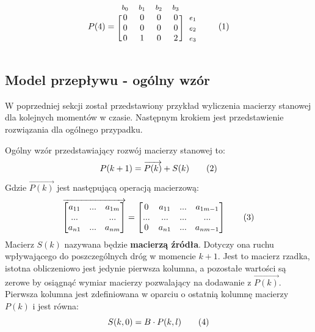 \documentclass[12pt]{book}
\newcommand\addtag{\refstepcounter{equation}
\tag{\theequation}}
\begin{document}
\begin{equation*}
  P(4)=
  \begin{blockarray}{*{4}{c} l}
    \begin{block}{*{4}{>{$\footnotesize}c<{$}} l}
     $b_0$ & $b_1$ & $b_2$ & $b_3$ \\
    \end{block}
    \begin{block}{[*{4}{c}]>{$\footnotesize}l<{$}}
       0 & 0 & 0 & 0 & $e_1$ \\
       0 & 0 & 0 & 0 & $e_2$ \\
       0 & 1 & 0 & 2 & $e_3$ \\
    \end{block}
  \end{blockarray} \addtag
\end{equation*}

\subsection{Model przepływu - ogólny wzór}
W poprzedniej sekcji został przedstawiony przykład wyliczenia macierzy stanowej dla kolejnych momentów w czasie. Następnym krokiem jest przedstawienie rozwiązania dla ogólnego przypadku. \\ 

\begin{tcolorbox}

Ogólny wzór przedstawiający rozwój macierzy stanowej to:
\[P(k+1)=\overrightarrow{P(k)} + S(k) \addtag \label{eq:P}\]
Gdzie $\overrightarrow{P(k)}$ jest następującą operacją macierzową:
\begin{gather}
\overrightarrow{
  \begin{bmatrix}
   a_{11} & ... & a_{1m}\\
   ... & & ...\\
   a_{n1} & ... & a_{nm}\\
   \end{bmatrix}}
 =
  \begin{bmatrix}
   0 & a_{11} & ... & a_{1m-1}\\
   ... & ... & ... & ...\\
   0 & a_{n1} & ... & a_{nm-1}\\
   \end{bmatrix}
   \addtag
   \label{arrow_function}
\end{gather}
Macierz $S(k)$ nazywana będzie \textbf{macierzą źródła}. Dotyczy ona ruchu wpływającego do poszczególnych dróg w momencie $k+1$. Jest to macierz rzadka, istotna obliczeniowo jest jedynie pierwsza kolumna, a pozostałe wartości są zerowe by osiągnąć wymiar macierzy pozwalający na dodawanie z $\overrightarrow{P(k)}$. Pierwsza kolumna jest zdefiniowana w oparciu o ostatnią kolumnę macierzy $P(k)$ i jest równa:
\[S(k,0)=B\cdot P(k,l) \addtag \label{eq:S} \]
\end{tcolorbox}
\end{document}
